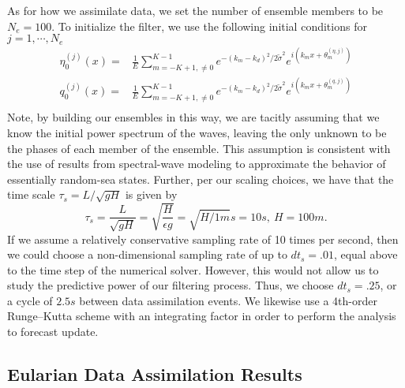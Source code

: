As for how we assimilate data, we set the number of ensemble members to be $N_{e}=100$.  To initialize the filter, we use the following initial conditions for $j=1,\cdots,N_{e}$   
\begin{align*}
	\eta^{(j)}_{0}(x) = & \frac{1}{E}\sum_{m=-K+1,\neq0}^{K-1} e^{-\left(k_{m}-k_{d}\right)^{2}/2\tilde{\sigma}^{2}}e^{i(k_{m}x+\theta^{(\eta,j)}_{m})}\\
	q^{(j)}_{0}(x) = & \frac{1}{E}\sum_{m=-K+1,\neq0}^{K-1} e^{-\left(k_{m}-k_{d}\right)^{2}/2\tilde{\sigma}^{2}}e^{i(k_{m}x+\theta^{(q,j)}_{m})}\\
\end{align*}
Note, by building our ensembles in this way, we are tacitly assuming that we know the initial power spectrum of the waves, leaving the only unknown to be the phases of each member of the ensemble.  This assumption is consistent with the use of results from spectral-wave modeling to approximate the behavior of essentially random-sea states.  
Further, per our scaling choices, we have that the time scale $\tau_{s} = L/\sqrt{gH}$ is given by
\[
\tau_{s}=\frac{L}{\sqrt{gH}} = \sqrt{\frac{H}{\epsilon g}} = \sqrt{H/1m}s = 10 s, ~H=100 m.
\]
If we assume a relatively conservative sampling rate of 10 times per second, then we could choose a non-dimensional sampling rate of up to $dt_{s} = .01$, equal above to the time step of the numerical solver.  However, this would not allow us to study the predictive power of our filtering process.  Thus, we choose $dt_{s}=.25$, or a cycle of $2.5s$ between data assimilation events.  We likewise use a 4th-order Runge--Kutta scheme with an integrating factor in order to perform the analysis to forecast update.  

\subsection*{Eularian Data Assimilation Results}


